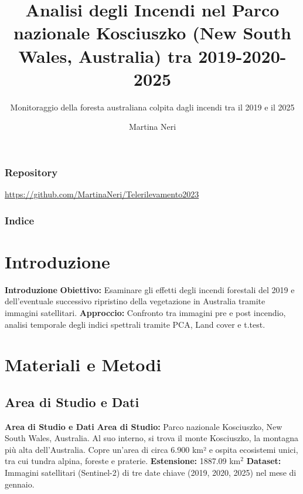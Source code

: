 \documentclass{beamer}
\title{\textbf{\textcolor{verdeScuro}{Analisi degli Incendi nel Parco nazionale Kosciuszko (New South Wales, Australia) tra 2019-2020-2025}}}
\subtitle{Monitoraggio della foresta australiana colpita dagli incendi tra il 2019 e il 2025}
\author{Martina Neri}
\begin{document}
\maketitle

\begin{frame}
\frametitle{Repository}
\href{https://github.com/MartinaNeri/Telerilevamento2023}{https://github.com/MartinaNeri/Telerilevamento2023}
\end{frame}

\begin{frame}
\frametitle{Indice}
\tableofcontents
\end{frame}

\section{Introduzione}

\begin{frame}{\textbf{Introduzione}}
\textbf{Obiettivo:} Esaminare gli effetti degli incendi forestali del 2019 e dell'eventuale successivo ripristino della vegetazione in Australia tramite immagini satellitari.
\newline
\newline
\textbf{Approccio:} Confronto tra immagini pre e post incendio, analisi temporale degli indici spettrali tramite PCA, Land cover e t.test.
\end{frame}

\section{Materiali e Metodi}

\subsection{Area di Studio e Dati}

\begin{frame}{\textbf{Area di Studio e Dati}}
\textbf{Area di Studio:} Parco nazionale Kosciuszko, New South Wales, Australia.
Al suo interno, si trova il monte Kosciuszko, la montagna più alta dell'Australia.
Copre un'area di circa 6.900 km² e ospita ecosistemi unici, tra cui tundra alpina, foreste e praterie.
\newline
\newline
\textbf{Estensione:} 1887.09 km\(^2\)
\newline
\newline
\textbf{Dataset:} Immagini satellitari (Sentinel-2) di tre date chiave (2019, 2020, 2025) nel mese di gennaio.
\end{frame}
\end{document}
